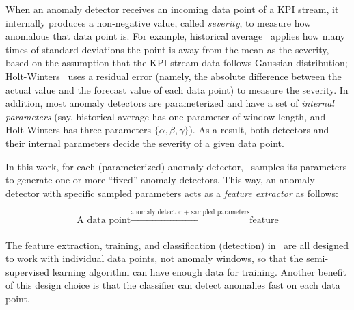   When an anomaly detector receives an incoming data point of a KPI stream, it internally produces a non-negative value, called \textit{severity}, to measure how anomalous that data point is. 
  For example, historical average~\cite{lee2012threshold} applies how many times of standard deviations the point is away from the mean as the severity, based on the assumption that the KPI stream data follows Gaussian distribution; Holt-Winters~\cite{yan2012argus} uses a residual error (namely, the absolute difference between the actual value and the forecast value of each data point) to measure the severity. 
  In addition, most anomaly detectors are parameterized and have a set of \textit{internal parameters} (say, historical average has one parameter of window length, and Holt-Winters has three parameters $\{\alpha,\beta, \gamma\}$). 
  As a result, both detectors and their internal parameters decide the severity of a given data point.

In this work, for each (parameterized) anomaly detector, \name~samples its parameters to generate one or more ``fixed'' anomaly detectors. This way, an anomaly detector with specific sampled parameters acts as a \textit{feature extractor} as follows:

$$\text{A data point} \xrightarrow[\text{}] {\text{anomaly detector + sampled parameters}} \text{feature}$$

The feature extraction, training, and classification (detection) in \name~are all designed to work with individual data points, not anomaly windows, so that the semi-supervised learning algorithm can have enough data for training. Another benefit of this design choice is that the classifier can detect anomalies fast on each data point.

